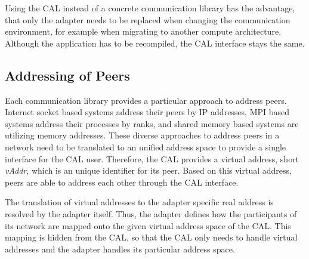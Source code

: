 \noindent Using the CAL instead of a concrete communication library has
the advantage, that only the adapter needs to be replaced when
changing the communication environment, for example when migrating
to another compute architecture. Although the application has
to be recompiled, the CAL interface stays the same.




\subsection{Addressing of Peers}
Each communication library provides a particular approach to address
peers. Internet socket based systems
address their peers by IP addresses, MPI based systems address their
processes by ranks, and shared memory based systems are utilizing
memory addresses.  These diverse approaches to address peers in a
network need to be translated to an unified address space to provide a
single interface for the CAL user.  Therefore, the CAL provides a
virtual address, short \emph{vAddr}, which is an unique identifier for
its peer. Based on this virtual address, peers are able to address
each other through the CAL interface.

The translation of virtual addresses to the adapter specific real
address is resolved by the adapter itself. Thus, the adapter defines
how the participants of its network are mapped onto the given virtual
address space of the CAL. This mapping is hidden from the CAL, so that
the CAL only needs to handle virtual addresses and the adapter handles
its particular address space.

